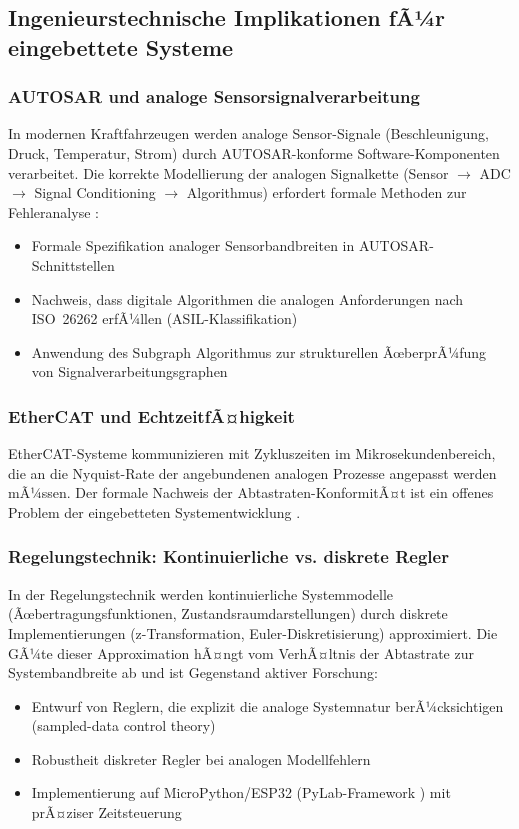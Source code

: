 ﻿\documentclass[a4paper,12pt]{article}
\theoremstyle{definition}
\begin{document}
\subsection{Ingenieurstechnische Implikationen fÃ¼r eingebettete Systeme}

\subsubsection{AUTOSAR und analoge Sensorsignalverarbeitung}

In modernen Kraftfahrzeugen werden analoge Sensor-Signale (Beschleunigung,
Druck, Temperatur, Strom) durch AUTOSAR-konforme Software-Komponenten
verarbeitet.  Die korrekte Modellierung der analogen Signalkette
(Sensor $\to$ ADC $\to$ Signal Conditioning $\to$ Algorithmus) erfordert
formale Methoden zur Fehleranalyse \citep{Autosar2023}:
\begin{itemize}
    \item Formale Spezifikation analoger Sensorbandbreiten in AUTOSAR-Schnittstellen
    \item Nachweis, dass digitale Algorithmen die analogen Anforderungen nach
          ISO~26262 erfÃ¼llen (ASIL-Klassifikation)
    \item Anwendung des Subgraph Algorithmus \citep{Epp2026embedded} zur
          strukturellen ÃœberprÃ¼fung von Signalverarbeitungsgraphen
\end{itemize}

\subsubsection{EtherCAT und EchtzeitfÃ¤higkeit}

EtherCAT-Systeme kommunizieren mit Zykluszeiten im Mikrosekundenbereich,
die an die Nyquist-Rate der angebundenen analogen Prozesse angepasst werden mÃ¼ssen.
Der formale Nachweis der Abtastraten-KonformitÃ¤t ist ein offenes Problem der
eingebetteten Systementwicklung \citep{Epp2026ehae}.

\subsubsection{Regelungstechnik: Kontinuierliche vs. diskrete Regler}

In der Regelungstechnik werden kontinuierliche Systemmodelle
(Ãœbertragungsfunktionen, Zustandsraumdarstellungen) durch diskrete
Implementierungen (z-Transformation, Euler-Diskretisierung) approximiert.
Die GÃ¼te dieser Approximation hÃ¤ngt vom VerhÃ¤ltnis der Abtastrate zur
Systembandbreite ab und ist Gegenstand aktiver Forschung:
\begin{itemize}
    \item Entwurf von Reglern, die explizit die analoge Systemnatur berÃ¼cksichtigen
          (sampled-data control theory)
    \item Robustheit diskreter Regler bei analogen Modellfehlern
    \item Implementierung auf MicroPython/ESP32 (PyLab-Framework \citep{Epp2026pylab})
          mit prÃ¤ziser Zeitsteuerung
\end{itemize}
\end{document}
